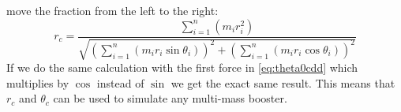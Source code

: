 \documentclass[titlepage]{article}
\numberwithin{equation}{section}
\begin{document}
move the fraction from the left to the right:
\begin{equation}
r_c = \frac{
    \sum_{i=1}^{n}(m_i r_i^2)
} {
    \sqrt{
        \left(\sum_{i=1}^{n}(m_i r_i \sin \theta_i)\right)^2
      + \left(\sum_{i=1}^{n}(m_i r_i \cos \theta_i)\right)^2
    }
}
\end{equation}
If we do the same calculation with the first force in \ref{eq:theta0cdd} which multiplies by $\cos$ instead of $\sin$ we get the exact same result. This means that $r_c$ and $\theta_c$ can be used to simulate any multi-mass booster.
\end{document}
